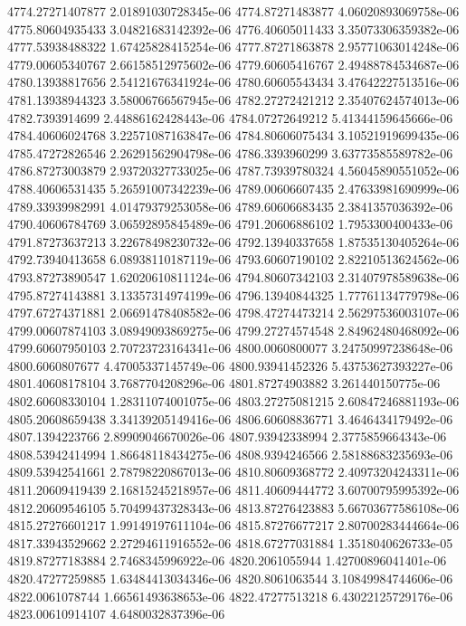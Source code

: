 {4774.27271407877 2.01891030728345e-06
4774.87271483877 4.06020893069758e-06
4775.80604935433 3.04821683142392e-06
4776.40605011433 3.35073306359382e-06
4777.53938488322 1.67425828415254e-06
4777.87271863878 2.95771063014248e-06
4779.00605340767 2.66158512975602e-06
4779.60605416767 2.49488784534687e-06
4780.13938817656 2.54121676341924e-06
4780.60605543434 3.47642227513516e-06
4781.13938944323 3.58006766567945e-06
4782.27272421212 2.35407624574013e-06
4782.7393914699 2.44886162428443e-06
4784.07272649212 5.41344159645666e-06
4784.40606024768 3.22571087163847e-06
4784.80606075434 3.10521919699435e-06
4785.47272826546 2.26291562904798e-06
4786.3393960299 3.63773585589782e-06
4786.87273003879 2.93720327733025e-06
4787.73939780324 4.56045890551052e-06
4788.40606531435 5.26591007342239e-06
4789.00606607435 2.47633981690999e-06
4789.33939982991 4.01479379253058e-06
4789.60606683435 2.3841357036392e-06
4790.40606784769 3.06592895845489e-06
4791.20606886102 1.7953300400433e-06
4791.87273637213 3.22678498230732e-06
4792.13940337658 1.87535130405264e-06
4792.73940413658 6.08938110187119e-06
4793.60607190102 2.82210513624562e-06
4793.87273890547 1.62020610811124e-06
4794.80607342103 2.31407978589638e-06
4795.87274143881 3.13357314974199e-06
4796.13940844325 1.77761134779798e-06
4797.67274371881 2.06691478408582e-06
4798.47274473214 2.56297536003107e-06
4799.00607874103 3.08949093869275e-06
4799.27274574548 2.84962480468092e-06
4799.60607950103 2.70723723164341e-06
4800.0060800077 3.24750997238648e-06
4800.6060807677 4.47005337145749e-06
4800.93941452326 5.43753627393227e-06
4801.40608178104 3.7687704208296e-06
4801.87274903882 3.261440150775e-06
4802.60608330104 1.28311074001075e-06
4803.27275081215 2.60847246881193e-06
4805.20608659438 3.34139205149416e-06
4806.60608836771 3.4646434179492e-06
4807.1394223766 2.89909046670026e-06
4807.93942338994 2.3775859664343e-06
4808.53942414994 1.86648118434275e-06
4808.9394246566 2.58188683235693e-06
4809.53942541661 2.78798220867013e-06
4810.80609368772 2.40973204243311e-06
4811.20609419439 2.16815245218957e-06
4811.40609444772 3.60700795995392e-06
4812.20609546105 5.70499437328343e-06
4813.87276423883 5.66703677586108e-06
4815.27276601217 1.99149197611104e-06
4815.87276677217 2.80700283444664e-06
4817.33943529662 2.27294611916552e-06
4818.67277031884 1.3518040626733e-05
4819.87277183884 2.7468345996922e-06
4820.2061055944 1.42700896041401e-06
4820.47277259885 1.63484413034346e-06
4820.8061063544 3.10849984744606e-06
4822.0061078744 1.66561493638653e-06
4822.47277513218 6.43022125729176e-06
4823.00610914107 4.6480032837396e-06
}
